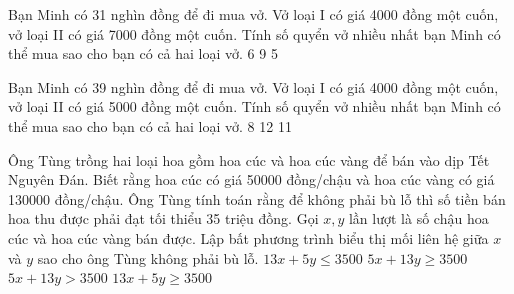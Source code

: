 \begin{ex}
Bạn Minh có 31 nghìn đồng để đi mua vở. Vở loại I có giá 4000 đồng một cuốn, vở loại II có giá 7000 đồng một cuốn. Tính số quyển vở nhiều nhất bạn Minh có thể mua sao cho bạn có cả hai loại vở.
\choice
{}
{6}
{9}
{5}
\end{ex}

\begin{ex}
Bạn Minh có 39 nghìn đồng để đi mua vở. Vở loại I có giá 4000 đồng một cuốn, vở loại II có giá 5000 đồng một cuốn. Tính số quyển vở nhiều nhất bạn Minh có thể mua sao cho bạn có cả hai loại vở.
\choice
{8}
{12}
{}
{11}
\end{ex}

\begin{ex}
 Ông Tùng trồng hai loại hoa gồm hoa cúc và hoa cúc vàng để bán vào dịp Tết Nguyên Đán. Biết rằng hoa cúc có giá 50000 đồng/chậu và hoa cúc vàng có giá 130000 đồng/chậu. Ông Tùng tính toán rằng để không phải bù lỗ thì số tiền bán hoa thu được phải đạt tối thiểu 35 triệu đồng. Gọi ${x,y}$ lần lượt là số chậu hoa cúc và hoa cúc vàng bán được. Lập bất phương trình biểu thị mối liên hệ giữa ${x}$ và ${y}$ sao cho ông Tùng không phải bù lỗ.
\choice
{ $13x+5y\le 3500$ }
{ \True $5x+13y\ge 3500$ }
{ $5x+13y>3500$ }
{ $13x+5y\ge 3500$ }
\end{ex}

